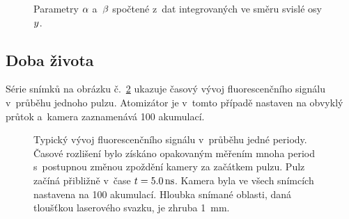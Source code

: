 \begin{figure}[htp]
	\centering
	
	\caption{Parametry $\alpha$ a~$\beta$ spočtené z~dat integrovaných
		ve směru svislé osy $y$.}
	\label{fig:lif-saturation-x-params}
\end{figure}

\subsection{Doba života}
\label{sec:lif-lifetime}

Série snímků na obrázku č.~\ref{fig:lif-timeev} ukazuje časový vývoj
fluorescenčního signálu v~průběhu jednoho pulzu.
Atomizátor je v~tomto případě nastaven na obvyklý průtok
a~kamera zaznamenává 100 akumulací.

\begin{figure}[p]
	\centering
	
	\caption{Typický vývoj fluorescenčního signálu v~průběhu jedné periody.
		Časové rozlišení bylo získáno opakovaným měřením mnoha period
		s~postupnou změnou zpoždění kamery za začátkem pulzu.
		Pulz začíná přibližně v~čase $t = \SI{5.0}{\nano\second}$.
		Kamera byla ve všech snímcích nastavena na \num{100} akumulací.
		Hloubka snímané oblasti, daná tloušťkou laserového svazku,
		je zhruba \SI{1}{\milli\metre}.}
	\label{fig:lif-timeev}
\end{figure}
